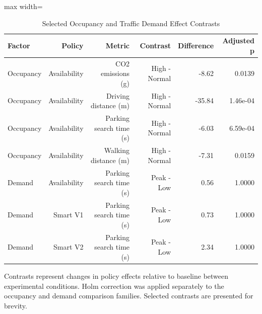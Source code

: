 \begin{table}[t]
\centering
\caption{Selected Occupancy and Traffic Demand Effect Contrasts}
\label{tab:condition_effects}
\small
\setlength{\tabcolsep}{4pt}
\begin{adjustbox}{max width=\textwidth}

\begin{tabular}{lrrrrr}
\toprule
Factor & Policy & Metric & Contrast & Difference & Adjusted p\\
\midrule
Occupancy & Availability & CO2 emissions (g) & High - Normal & -8.62 & 0.0139\\
Occupancy & Availability & Driving distance (m) & High - Normal & -35.84 & 1.46e-04\\
Occupancy & Availability & Parking search time (s) & High - Normal & -6.03 & 6.59e-04\\
Occupancy & Availability & Walking distance (m) & High - Normal & -7.31 & 0.0159\\
Demand & Availability & Parking search time (s) & Peak - Low & 0.56 & 1.0000\\
\addlinespace
Demand & Smart V1 & Parking search time (s) & Peak - Low & 0.73 & 1.0000\\
Demand & Smart V2 & Parking search time (s) & Peak - Low & 2.34 & 1.0000\\
\bottomrule
\end{tabular}
\end{adjustbox}
\par\smallskip
\begin{minipage}{\textwidth}
\footnotesize
Contrasts represent changes in policy effects relative to baseline between experimental conditions. Holm correction was applied separately to the occupancy and demand comparison families. Selected contrasts are presented for brevity.
\end{minipage}
\end{table}
